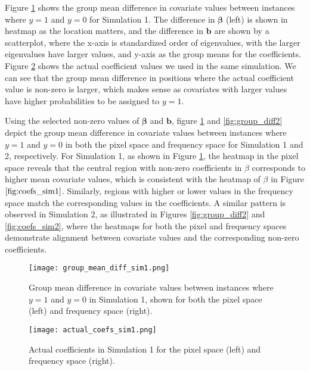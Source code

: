 \documentclass[12pt]{article}
\begin{document}
Figure \ref{fig:group_diff1} shows the group mean difference in covariate values between instances where \( y = 1 \) and \( y = 0 \) for Simulation 1. The difference in \( \boldsymbol{\beta} \) (left) is shown in heatmap as the location matters, and the difference in \( \mathbf{b} \) are shown by a scatterplot, where the x-axis is standardized order of eigenvalues, with the larger eigenvalues have larger values, and y-axis as the group means for the coefficients. Figure \ref{fig:coefs_sim1} shows the actual coefficient values we used in the same simulation. We can see that the group mean difference in positions where the actual coefficient value is non-zero is larger, which makes sense as covariates with larger values have higher probabilities to be assigned to \( y = 1 \).

Using the selected non-zero values of \( \boldsymbol{\beta} \) and \( \mathbf{b} \), figure \ref{fig:group_diff1} and \ref{fig:group_diff2} depict the group mean difference in covariate values between instances where \( y = 1 \) and \( y = 0 \) in both the pixel space and frequency space for Simulation 1 and 2, respectively. For Simulation 1, as shown in Figure \ref{fig:group_diff1}, the heatmap in the pixel space reveals that the central region with non-zero coefficients in \( \beta \) corresponds to higher mean covariate values, which is consistent with the heatmap of \( \beta \) in Figure \( \ref{fig:coefs_sim1} \). Similarly, regions with higher or lower values in the frequency space match the corresponding values in the coefficients. A similar pattern is observed in Simulation 2, as illustrated in Figures \ref{fig:group_diff2} and \ref{fig:coefs_sim2}, where the heatmaps for both the pixel and frequency spaces demonstrate alignment between covariate values and the corresponding non-zero coefficients.

\begin{figure}[h!]
	\centering
	\texttt{[image: group\_mean\_diff\_sim1.png]}
	\caption{Group mean difference in covariate values between instances where \( y = 1 \) and \( y = 0 \) in Simulation
		1, shown for both the pixel space (left) and frequency space (right).}
	\label{fig:group_diff1}
\end{figure}

\begin{figure}[h!]
	\centering
	\texttt{[image: actual\_coefs\_sim1.png]}
	\caption{Actual coefficients in Simulation 1 for the pixel space (left) and frequency space (right).}
	\label{fig:coefs_sim1}
\end{figure}
\end{document}

